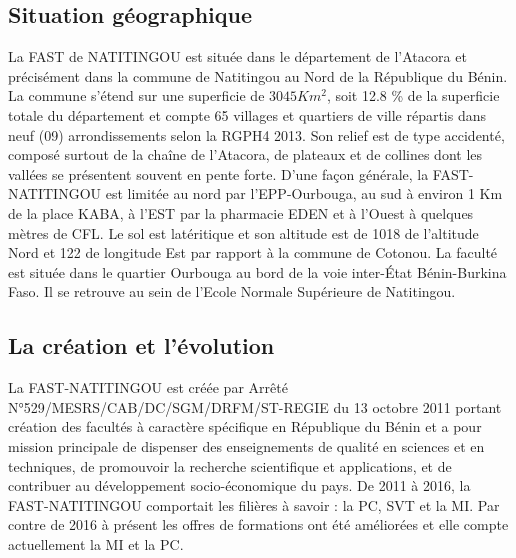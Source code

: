 \documentclass[a4paper,12pt]{report}
\theoremstyle{definition}
\begin{document}
	\subsection{Situation géographique}
	La FAST de NATITINGOU est située dans le département de l’Atacora et précisément dans la commune de Natitingou au Nord de la République du Bénin. La commune s’étend sur une superficie de $3045Km^2$, soit 12.8 \% de la superficie totale du département et compte 65 villages	et quartiers de ville répartis dans neuf (09) arrondissements selon la RGPH4 2013. Son relief est de type accidenté, composé surtout de la chaîne de l’Atacora, de plateaux et de collines dont	les vallées se présentent souvent en pente forte. D’une façon générale, la FAST-NATITINGOU est limitée au nord par l’EPP-Ourbouga, au sud à environ 1 Km de la place KABA, à l’EST par la pharmacie EDEN et à l’Ouest à quelques mètres de CFL. Le sol est latéritique et son altitude	est de 1018 de l’altitude Nord et 122 de longitude Est par rapport à la commune de Cotonou.	La faculté est située dans le quartier Ourbouga au bord de la voie inter-État Bénin-Burkina Faso. Il se retrouve au sein de l’Ecole Normale Supérieure de Natitingou.
	
	\subsection{La création et l’évolution}
	La FAST-NATITINGOU est créée par Arrêté N°529/MESRS/CAB/DC/SGM/DRFM/ST-REGIE du 13 octobre 2011 portant création des facultés à caractère spécifique en République du Bénin et a pour mission principale de dispenser des enseignements de qualité en sciences et en techniques, de promouvoir la recherche scientifique et applications, et de contribuer au développement socio-économique du pays. De 2011 à 2016, la FAST-NATITINGOU comportait les filières à savoir : la PC, SVT et la MI. Par contre de 2016 à présent les offres de formations ont été améliorées et elle compte actuellement la MI et la PC.
	
\end{document}
